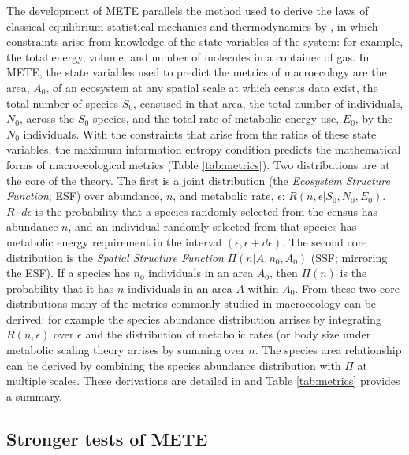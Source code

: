The development of METE parallels the method used to derive the laws
of classical equilibrium statistical mechanics and thermodynamics by
\citet{Jaynes:1957to}, in which constraints arise from knowledge of
the state variables of the system: for example, the total energy,
volume, and number of molecules in a container of gas. In METE, the
state variables used to predict the metrics of macroecology are the
area, $A_0$, of an ecosystem at any spatial scale at which census data
exist, the total number of species $S_0$, censused in that area, the
total number of individuals, $N_0$, across the $S_0$ species, and the
total rate of metabolic energy use, $E_0$, by the $N_0$ individuals.
With the constraints that arise from the ratios of these state
variables, the maximum information entropy condition predicts the
mathematical forms of macroecological metrics (Table
\ref{tab:metrics}). Two distributions are at the core of the theory.
The first is a joint distribution (the \textit{Ecosystem Structure
  Function}; ESF) over abundance, $n$, and metabolic rate, $\epsilon$:
$R(n, \epsilon|S_0, N_0, E_0)$. $R \cdot d\epsilon$ is the probability
that a species randomly selected from the census has abundance $n$,
and an individual randomly selected from that species has metabolic
energy requirement in the interval $(\epsilon, \epsilon+d\epsilon)$.
The second core distribution is the \textit{Spatial Structure Function}
$\Pi(n|A, n_0, A_0)$ (SSF; mirroring the ESF). If a species has $n_0$
individuals in an area $A_0$, then $\Pi(n)$ is the probability that it
has $n$ individuals in an area $A$ within $A_0$. From these two core
distributions many of the metrics commonly studied in macroecology can
be derived: for example the species abundance distribution arrises by
integrating $R(n, \epsilon)$ over $\epsilon$ and the distribution of
metabolic rates (or body size under metabolic scaling theory
\citep{brown2004metab} arrises by summing over $n$. The species area
relationship can be derived by combining the species abundance
distribution with $\Pi$ at multiple scales. These derivations are
detailed in \citet{Harte:2011ut} and Table \ref{tab:metrics} provides
a summary.


\subsection{Stronger tests of METE}

